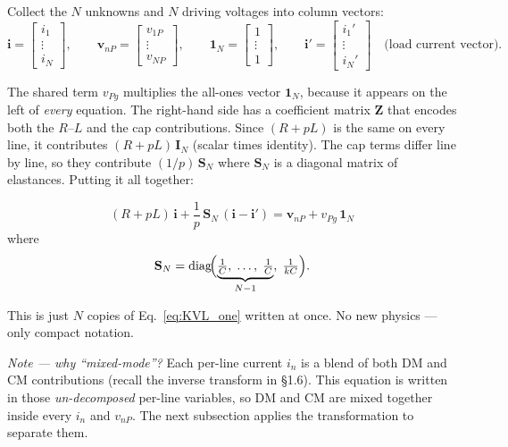 Collect the $N$ unknowns and $N$ driving voltages into column
vectors:
\[
    \mathbf{i} = \begin{bmatrix} i_1 \\ \vdots \\ i_N \end{bmatrix},
    \qquad
    \mathbf{v}_{nP} = \begin{bmatrix} v_{1P} \\ \vdots \\ v_{NP} \end{bmatrix},
    \qquad
    \mathbf{1}_N = \begin{bmatrix} 1 \\ \vdots \\ 1 \end{bmatrix},
    \qquad
    \mathbf{i}' = \begin{bmatrix} i_1' \\ \vdots \\ i_N' \end{bmatrix}
    \quad\text{(load current vector)}.
\]

The shared term $v_{Pg}$ multiplies the all-ones vector
$\mathbf{1}_N$, because it appears on the left of \emph{every}
equation.  The right-hand side has a coefficient matrix
$\mathbf{Z}$ that encodes both the $R$--$L$ and the cap
contributions.  Since $(R + pL)$ is the same on every line, it
contributes $(R + pL)\,\mathbf{I}_N$ (scalar times identity).
The cap terms differ line by line, so they contribute
$(1/p)\,\mathbf{S}_N$ where $\mathbf{S}_N$ is a diagonal matrix
of elastances.  Putting it all together:

\begin{eqnbox}
\begin{equation}
    (R + pL)\,\mathbf{i}
    + \frac{1}{p}\,\mathbf{S}_N\,(\mathbf{i} - \mathbf{i}')
    = \mathbf{v}_{nP} + v_{Pg}\,\mathbf{1}_N
    \label{eq:MMeqn}
\end{equation}
where
\[
    \mathbf{S}_N
    = \operatorname{diag}\!\Bigl(
        \underbrace{\tfrac{1}{C},\;\ldots,\;\tfrac{1}{C}}_{N-1},\;
        \tfrac{1}{kC}
      \Bigr).
\]
\end{eqnbox}

This is just $N$ copies of Eq.~\eqref{eq:KVL_one} written
at once.  No new physics — only compact notation.

\textit{Note — why ``mixed-mode''?}  Each per-line current $i_n$
is a blend of both DM and CM contributions (recall the inverse
transform in \S1.6).  This equation is written in those
\emph{un-decomposed} per-line variables, so DM and CM are mixed
together inside every $i_n$ and $v_{nP}$.  The next subsection
applies the transformation to separate them.

